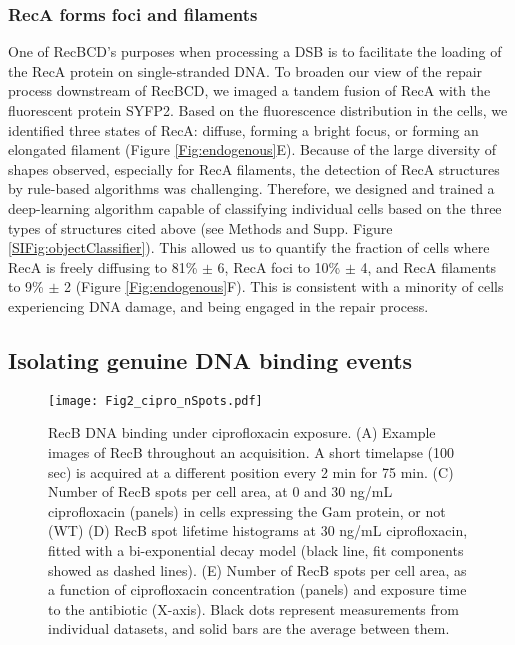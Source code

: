 \subsubsection*{RecA forms foci and filaments}
One of RecBCD's purposes when processing a DSB is to facilitate the loading of the RecA protein on single-stranded DNA. To broaden our view of the repair process downstream of RecBCD, we imaged a tandem fusion of RecA with the fluorescent protein SYFP2.\cite{} Based on the fluorescence distribution in the cells, we identified three states of RecA: diffuse, forming a bright focus, or forming an elongated filament (Figure \ref{Fig:endogenous}E). Because of the large diversity of shapes observed, especially for RecA filaments, the detection of RecA structures by rule-based algorithms was challenging. Therefore, we designed and trained a deep-learning algorithm capable of classifying individual cells based on the three types of structures cited above (see Methods and Supp. Figure \ref{SIFig:objectClassifier}). This allowed us to quantify the fraction of cells where RecA is freely diffusing to 81\% $\pm$ 6, RecA foci to 10\% $\pm$ 4, and RecA filaments to 9\% $\pm$ 2 (Figure \ref{Fig:endogenous}F). This is consistent with a minority of cells experiencing DNA damage, and being engaged in the repair process.

\subsection*{Isolating genuine DNA binding events}

\begin{figure*}[htbp]
\begin{center}
\texttt{[image: Fig2\_cipro\_nSpots.pdf]}
\end{center}
\caption{RecB DNA binding under ciprofloxacin exposure. (A) Example images of RecB throughout an acquisition. A short timelapse (100 sec) is acquired at a different position every 2 min for 75 min. (C) Number of RecB spots per cell area, at 0 and 30 ng/mL ciprofloxacin (panels) in cells expressing the Gam protein, or not (WT) (D) RecB spot lifetime histograms at 30 ng/mL ciprofloxacin, fitted with a bi-exponential decay model (black line, fit components showed as dashed lines). (E) Number of RecB spots per cell area, as a function of ciprofloxacin concentration (panels) and exposure time to the antibiotic (X-axis). Black dots represent measurements from individual datasets, and solid bars are the average between them.}
\label{Fig:nspots}
\end{figure*}

